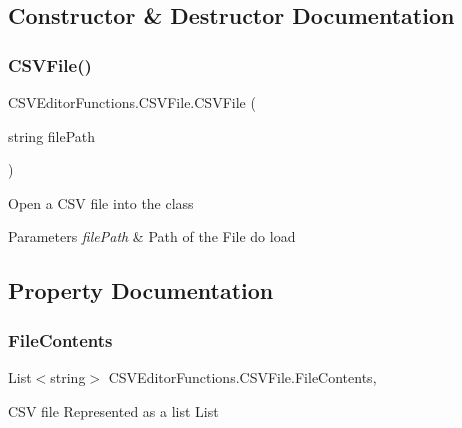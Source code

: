 \subsection{Constructor \& Destructor Documentation}
\mbox{\label{class_c_s_v_editor_functions_1_1_c_s_v_file_a73bd62298c2835a5f451c0f315f935e9}} 
\subsubsection{\texorpdfstring{CSVFile()}{CSVFile()}}
{\footnotesize\ttfamily C\+S\+V\+Editor\+Functions.\+C\+S\+V\+File.\+C\+S\+V\+File (\begin{DoxyParamCaption}\item[{string}]{file\+Path }\end{DoxyParamCaption})}



Open a C\+SV file into the class 


\begin{DoxyParams}{Parameters}
{\em file\+Path} & Path of the File do load\\
\hline
\end{DoxyParams}


\subsection{Property Documentation}
\mbox{\label{class_c_s_v_editor_functions_1_1_c_s_v_file_ab6d28a5bed44355befc4e395271ff5eb}} 
\subsubsection{\texorpdfstring{FileContents}{FileContents}}
{\footnotesize\ttfamily List$<$string$>$ C\+S\+V\+Editor\+Functions.\+C\+S\+V\+File.\+File\+Contents\hspace{0.3cm}{\ttfamily [get]}, {\ttfamily [set]}}



C\+SV file Represented as a list List 

